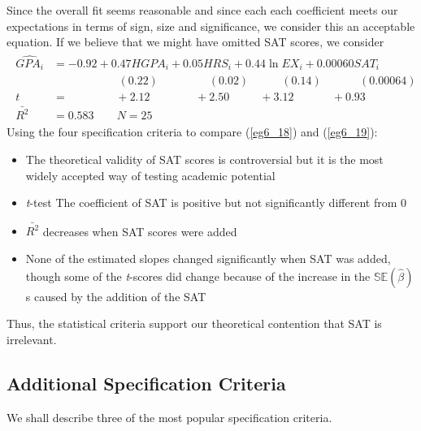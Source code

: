 \documentclass[11pt]{article}
\begin{document}
Since the overall fit seems reasonable and since each each coefficient meets our expectations in terms of sign, size and significance, we consider this an acceptable equation. If we believe that we might have omitted SAT scores, we consider
\begin{align}
\label{eg6_19}
\begin{split}
\widehat{GPA_i} &= -0.92 + {0.47HGPA_i} + {0.05HRS_i} + {0.44\ln EX_i} + 0.00060 SAT_i\\
&\>\>\>\>\>\>\>\>\>\>\>\>\>\>\>\>\>\>\>\>\>\>\>\>\>\> (0.22) 
\>\>\>\>\>\>\>\>\>\>\>\>\>\>\>\>\>\>\>\> (0.02)
\>\>\>\>\>\>\>\>\>\>\>\>\> (0.14)
\>\>\>\>\>\>\>\>\>\>\>\>\>\>\> (0.00064)\\
t&=\>\>\>\>\>\>\>\>\>\>\>\>\>\>\>\>\>\>\> +2.12 
\>\>\>\>\>\>\>\>\>\>\>\>\>\>\>\>\>\>+2.50
\>\>\>\>\>\>\>\>\>\>\>\> +3.12
\>\>\>\>\>\>\>\>\>\>\>\>\>\>\> +0.93\\
\bar{R^2}&= 0.583 \quad\quad N=25
\end{split}
\end{align}
Using the four specification criteria to compare (\ref{eg6_18}) and (\ref{eg6_19}):
\begin{itemize}
\item The theoretical validity of SAT scores is controversial but it is the most widely accepted way of testing academic potential
\item \textit{t}-test The coefficient of SAT is positive but not significantly different from 0
\item $\bar{R^2}$ decreases when SAT scores were added
\item None of the estimated slopes changed significantly when SAT was added, though some of the \textit{t}-scores did change because of the increase in the $\mathbb{SE}(\hat{\beta})$s caused by the addition of the SAT
\end{itemize}
Thus, the statistical criteria support our theoretical contention that SAT is irrelevant.
\subsection{Additional Specification Criteria}
We shall describe three of the most popular specification criteria.
\end{document}
